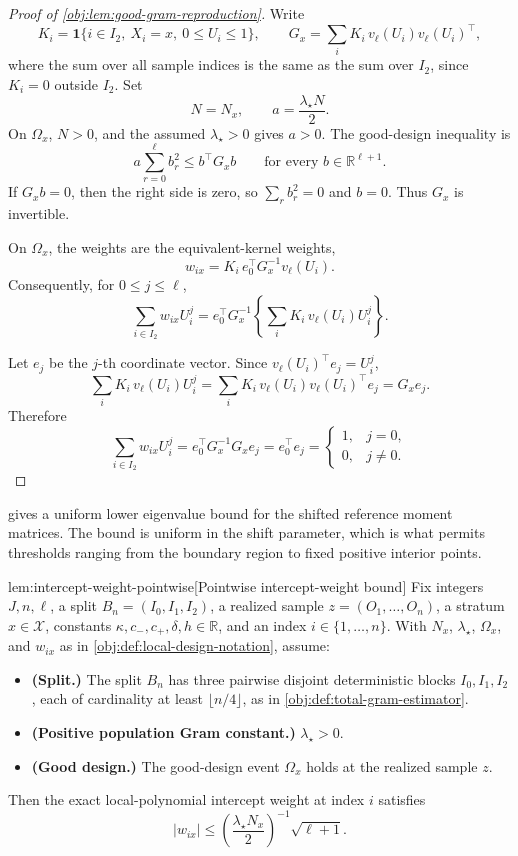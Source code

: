 \documentclass[11pt]{article}
\begin{document}
\begin{proof}[Proof of \cref{obj:lem:good-gram-reproduction}]
Write
\[
K_i=\mathbf 1\{i\in I_2,\ X_i=x,\ 0\le U_i\le1\},
\qquad
G_x=\sum_{i}K_i\,v_\ell(U_i)v_\ell(U_i)^\top ,
\]
where the sum over all sample indices is the same as the sum over \(I_2\), since \(K_i=0\) outside \(I_2\).  Set
\[
N=N_x,\qquad
a=\frac{\lambda_\star N}{2}.
\]
On \(\Omega_x\), \(N>0\), and the assumed \(\lambda_\star>0\) gives \(a>0\).  The good-design inequality is
\[
a\sum_{r=0}^{\ell}b_r^2
\le
b^\top G_x b
\qquad\text{for every }b\in\mathbb R^{\ell+1}.
\]
If \(G_x b=0\), then the right side is zero, so \(\sum_rb_r^2=0\) and \(b=0\).  Thus \(G_x\) is invertible. %

On \(\Omega_x\), the weights are the equivalent-kernel weights,
\[
w_{ix}=K_i\,e_0^\top G_x^{-1}v_\ell(U_i).
\]
Consequently, for \(0\le j\le\ell\),
\[
\sum_{i\in I_2}w_{ix}U_i^j
=
e_0^\top G_x^{-1}
\left\{\sum_iK_i\,v_\ell(U_i)U_i^j\right\}.
\]

Let \(e_j\) be the \(j\)-th coordinate vector.  Since \(v_\ell(U_i)^\top e_j=U_i^j\),
\[
\sum_iK_i\,v_\ell(U_i)U_i^j
=
\sum_iK_i\,v_\ell(U_i)v_\ell(U_i)^\top e_j
=
G_xe_j .
\]
Therefore
\[
\sum_{i\in I_2}w_{ix}U_i^j
=
e_0^\top G_x^{-1}G_xe_j
=
e_0^\top e_j
=
\begin{cases}
1,&j=0,\\
0,&j\ne0.
\end{cases}
\]
\end{proof}

 gives a uniform lower eigenvalue bound for the shifted reference moment matrices. The bound is uniform in the shift parameter, which is what permits thresholds ranging from the boundary region to fixed positive interior points.

\begin{lemmav}{lem:intercept-weight-pointwise}[Pointwise intercept-weight bound]
Fix integers \(J,n,\ell\), a split \(B_n=(I_0,I_1,I_2)\), a realized sample \(z=(O_1,\ldots,O_n)\), a stratum \(x\in\mathcal X\), constants \(\kappa,c_-,c_+,\delta,h\in\mathbb R\), and an index \(i\in\{1,\ldots,n\}\).  With \(N_x\), \(\lambda_\star\), \(\Omega_x\), and \(w_{ix}\) as in \cref{obj:def:local-design-notation}, assume:
\begin{itemize}
\item \textbf{(Split.)} The split \(B_n\) has three pairwise disjoint deterministic blocks \(I_0,I_1,I_2\), each of cardinality at least \(\lfloor n/4\rfloor\), as in \cref{obj:def:total-gram-estimator}.
\item \textbf{(Positive population Gram constant.)} \(\lambda_\star>0\).
\item \textbf{(Good design.)} The good-design event \(\Omega_x\) holds at the realized sample \(z\).
\end{itemize}
Then the exact local-polynomial intercept weight at index \(i\) satisfies
\[
|w_{ix}|
\le
\left(\frac{\lambda_\star N_x}{2}\right)^{-1}\sqrt{\ell+1}.
\]
\end{lemmav}
\end{document}
